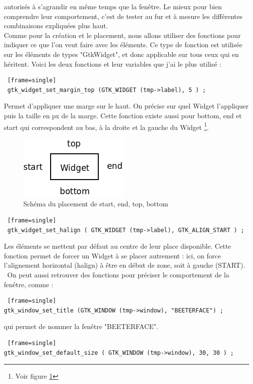 \documentclass[11pt,french,a4paper]{report}
\begin{document}
autorisés à s'agrandir en même temps que la fenêtre. Le mieux pour bien comprendre leur comportement, c'est de tester au fur
et à mesure les différentes combinaisons expliquées plus haut. \\
Comme pour la création et le placement, nous allons utiliser des fonctions pour indiquer ce que l'on veut faire avec les éléments.
Ce type de fonction est utilisée sur les éléments de types "GtkWidget", et donc applicable sur tous ceux qui en héritent. Voici les
deux fonctions et leur variables que j'ai le plus utilisé : \\
\begin{lstlisting} [frame=single]
 gtk_widget_set_margin_top (GTK_WIDGET (tmp->label), 5 ) ; 
\end{lstlisting}
Permet d'appliquer une marge sur le haut. On précise sur quel Widget l'appliquer puis la taille en px de la marge.
Cette fonction existe aussi pour bottom, end et start qui correspondent au bas, à la droite et la gauche du Widget
\footnote{Voir figure \ref{sch_pla_top}}.\\
\begin{figure} [!h]
    \centering
        \includegraphics[scale=0.5]{../images/dia/top_bottom_etc.png}
        \caption{Schéma du placement de start, end, top, bottom}
        \label{sch_pla_top}
\end{figure}
\begin{lstlisting} [frame=single]
 gtk_widget_set_halign ( GTK_WIDGET (tmp->label), GTK_ALIGN_START ) ;
\end{lstlisting}
Les éléments se mettent par défaut au centre de leur place disponible. Cette fonction permet 
de forcer un Widget à se placer autrement : ici, on force l'alignement horizontal (halign) à être en début de zone, 
soit à gauche (START). \
On peut aussi retrouver des fonctions pour préciser le comportement de la fenêtre, comme :
\begin{lstlisting} [frame=single]
gtk_window_set_title (GTK_WINDOW (tmp->window), "BEETERFACE") ; 
\end{lstlisting}
qui permet de nommer la fenêtre "BEETERFACE". \\
\begin{lstlisting} [frame=single]
gtk_window_set_default_size ( GTK_WINDOW (tmp->window), 30, 30 ) ; 
\end{lstlisting}
\end{document}
